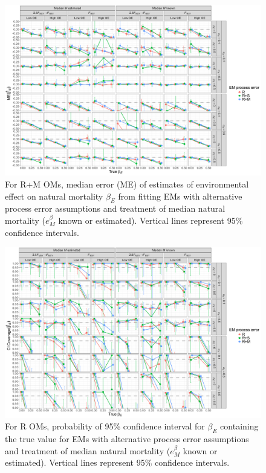 \documentclass[
  12pt,
]{article}
\begin{document}
\begin{landscape}
\begin{figure}
\begin{center}
\includegraphics[height = \textheight]{beta_E_bias_RMom}
\end{center}
\caption{For R+M OMs, median error (ME) of estimates of environmental effect on natural mortality $\beta_E$ from fitting EMs with alternative process error assumptions and treatment of median natural mortality ($e^\beta_M$ known or estimated). Vertical lines represent 95\% confidence intervals.}\label{beta_E_bias_RMom}
\end{figure}
\end{landscape}

\begin{landscape}
\begin{figure}
\begin{center}
\includegraphics[height = \textheight]{beta_E_CI_coverage_Rom}
\end{center}
\caption{For R OMs, probability of 95\% confidence interval for $\beta_E$ containing the true value for EMs with alternative process error assumptions and treatment of median natural mortality ($e^\beta_M$ known or estimated). Vertical lines represent 95\% confidence intervals.}\label{beta_E_CI_coverage_Rom}
\end{figure}
\end{landscape}
\end{document}
